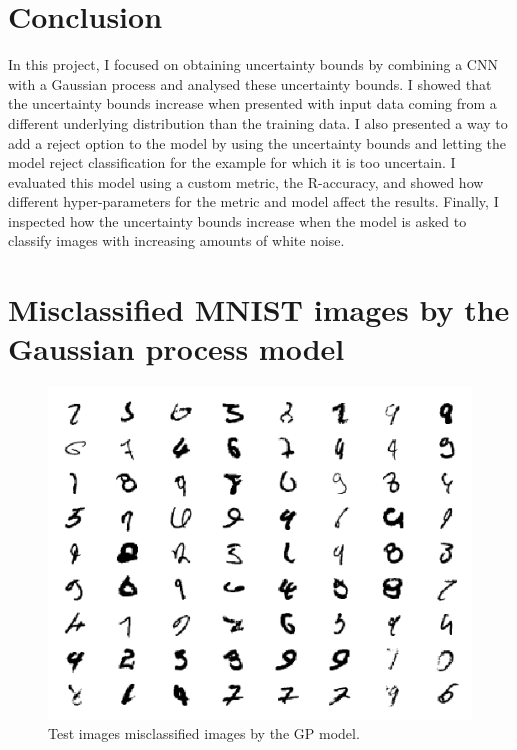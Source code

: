 \documentclass{article}
\begin{document}
\section{Conclusion}
In this project, I focused on obtaining uncertainty bounds by combining a CNN with a Gaussian process and analysed these uncertainty bounds. I showed that the uncertainty bounds increase when presented with input data coming from a different underlying distribution than the training data. I also presented a way to add a reject option to the model by using the uncertainty bounds and letting the model reject classification for the example for which it is too uncertain. I evaluated this model using a custom metric, the R-accuracy, and showed how different hyper-parameters for the metric and model affect the results. Finally, I inspected how the uncertainty bounds increase when the model is asked to classify images with increasing amounts of white noise.




\newpage
\appendix 
\section{Misclassified MNIST images by the Gaussian process model}
\label{appendix/mnist_error}

\begin{figure}[h]
	\centering
	\includegraphics[scale=1.1]{incorrect_mnist}
	\caption{Test images misclassified images by the GP model.}
	\label{fig/incorrect_mnist}
\end{figure}
\end{document}
